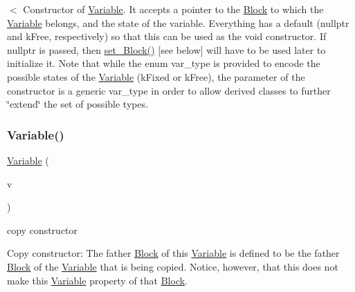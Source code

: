 $<$ Constructor of \mbox{\hyperlink{class_s_m_spp__di__unipi__it_1_1_variable}{Variable}}. It accepts a pointer to the \mbox{\hyperlink{class_s_m_spp__di__unipi__it_1_1_block}{Block}} to which the \mbox{\hyperlink{class_s_m_spp__di__unipi__it_1_1_variable}{Variable}} belongs, and the state of the variable. Everything has a default (nullptr and k\+Free, respectively) so that this can be used as the void constructor. If nullptr is passed, then \mbox{\hyperlink{class_s_m_spp__di__unipi__it_1_1_variable_ae25adfb4d0355dc999de19a850b0025d}{set\+\_\+\+Block()}} \mbox{[}see below\mbox{]} will have to be used later to initialize it. Note that while the enum var\+\_\+type is provided to encode the possible states of the \mbox{\hyperlink{class_s_m_spp__di__unipi__it_1_1_variable}{Variable}} (k\+Fixed or k\+Free), the parameter of the constructor is a generic var\+\_\+type in order to allow derived classes to further \char`\"{}extend\char`\"{} the set of possible types. \mbox{\label{class_s_m_spp__di__unipi__it_1_1_variable_af77975bb11838f0c93a91c030a0babcd}} 
\subsubsection{\texorpdfstring{Variable()}{Variable()}\hspace{0.1cm}{\footnotesize\ttfamily [2/2]}}
{\footnotesize\ttfamily \mbox{\hyperlink{class_s_m_spp__di__unipi__it_1_1_variable}{Variable}} (\begin{DoxyParamCaption}\item[{const \mbox{\hyperlink{class_s_m_spp__di__unipi__it_1_1_variable}{Variable}} \&}]{v }\end{DoxyParamCaption})\hspace{0.3cm}{\ttfamily [inline]}}



copy constructor 

Copy constructor\+: The father \mbox{\hyperlink{class_s_m_spp__di__unipi__it_1_1_block}{Block}} of this \mbox{\hyperlink{class_s_m_spp__di__unipi__it_1_1_variable}{Variable}} is defined to be the father \mbox{\hyperlink{class_s_m_spp__di__unipi__it_1_1_block}{Block}} of the \mbox{\hyperlink{class_s_m_spp__di__unipi__it_1_1_variable}{Variable}} that is being copied. Notice, however, that this does not make this \mbox{\hyperlink{class_s_m_spp__di__unipi__it_1_1_variable}{Variable}} property of that \mbox{\hyperlink{class_s_m_spp__di__unipi__it_1_1_block}{Block}}. \mbox{\label{class_s_m_spp__di__unipi__it_1_1_variable_a4319c110ceb0a5838046fa12e0720d31}} 
